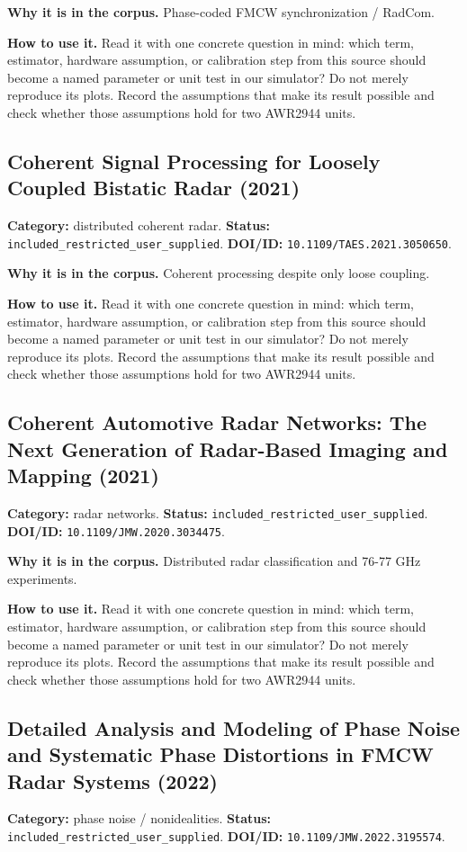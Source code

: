 \documentclass[11pt]{article}
\begin{document}
\textbf{Why it is in the corpus.} Phase-coded FMCW synchronization / RadCom.

\textbf{How to use it.} Read it with one concrete question in mind: which term, estimator, hardware assumption, or calibration step from this source should become a named parameter or unit test in our simulator? Do not merely reproduce its plots. Record the assumptions that make its result possible and check whether those assumptions hold for two AWR2944 units.

\subsection*{Coherent Signal Processing for Loosely Coupled Bistatic Radar (2021)}
\textbf{Category:} distributed coherent radar. \textbf{Status:} \nolinkurl{included_restricted_user_supplied}. \textbf{DOI/ID:} \nolinkurl{10.1109/TAES.2021.3050650}.

\textbf{Why it is in the corpus.} Coherent processing despite only loose coupling.

\textbf{How to use it.} Read it with one concrete question in mind: which term, estimator, hardware assumption, or calibration step from this source should become a named parameter or unit test in our simulator? Do not merely reproduce its plots. Record the assumptions that make its result possible and check whether those assumptions hold for two AWR2944 units.

\subsection*{Coherent Automotive Radar Networks: The Next Generation of Radar-Based Imaging and Mapping (2021)}
\textbf{Category:} radar networks. \textbf{Status:} \nolinkurl{included_restricted_user_supplied}. \textbf{DOI/ID:} \nolinkurl{10.1109/JMW.2020.3034475}.

\textbf{Why it is in the corpus.} Distributed radar classification and 76-77 GHz experiments.

\textbf{How to use it.} Read it with one concrete question in mind: which term, estimator, hardware assumption, or calibration step from this source should become a named parameter or unit test in our simulator? Do not merely reproduce its plots. Record the assumptions that make its result possible and check whether those assumptions hold for two AWR2944 units.

\subsection*{Detailed Analysis and Modeling of Phase Noise and Systematic Phase Distortions in FMCW Radar Systems (2022)}
\textbf{Category:} phase noise / nonidealities. \textbf{Status:} \nolinkurl{included_restricted_user_supplied}. \textbf{DOI/ID:} \nolinkurl{10.1109/JMW.2022.3195574}.
\end{document}
